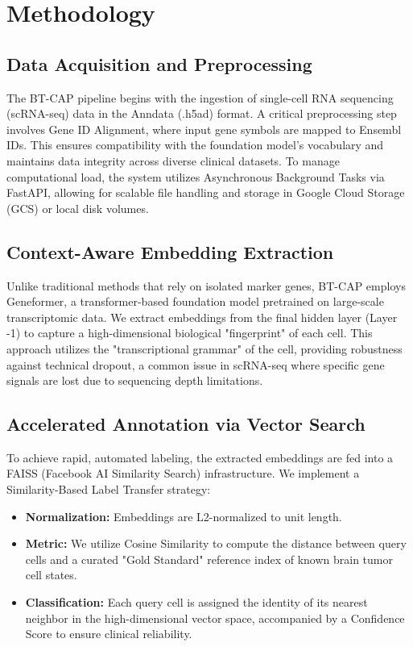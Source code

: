 \documentclass[conference]{IEEEtran}
\begin{document}
\section{Methodology}

\subsection{Data Acquisition and Preprocessing}
The BT-CAP pipeline begins with the ingestion of single-cell RNA sequencing (scRNA-seq) data in the Anndata (.h5ad) format. A critical preprocessing step involves Gene ID Alignment, where input gene symbols are mapped to Ensembl IDs. This ensures compatibility with the foundation model's vocabulary and maintains data integrity across diverse clinical datasets. To manage computational load, the system utilizes Asynchronous Background Tasks via FastAPI, allowing for scalable file handling and storage in Google Cloud Storage (GCS) or local disk volumes.

\subsection{Context-Aware Embedding Extraction}
Unlike traditional methods that rely on isolated marker genes, BT-CAP employs Geneformer, a transformer-based foundation model pretrained on large-scale transcriptomic data. We extract embeddings from the final hidden layer (Layer -1) to capture a high-dimensional biological "fingerprint" of each cell. This approach utilizes the "transcriptional grammar" of the cell, providing robustness against technical dropout, a common issue in scRNA-seq where specific gene signals are lost due to sequencing depth limitations.

\subsection{Accelerated Annotation via Vector Search}
To achieve rapid, automated labeling, the extracted embeddings are fed into a FAISS (Facebook AI Similarity Search) infrastructure. We implement a Similarity-Based Label Transfer strategy:

\begin{itemize}
    \item \textbf{Normalization:} Embeddings are L2-normalized to unit length.
    \item \textbf{Metric:} We utilize Cosine Similarity to compute the distance between query cells and a curated "Gold Standard" reference index of known brain tumor cell states.
    \item \textbf{Classification:} Each query cell is assigned the identity of its nearest neighbor in the high-dimensional vector space, accompanied by a Confidence Score to ensure clinical reliability.
\end{itemize}
\end{document}
